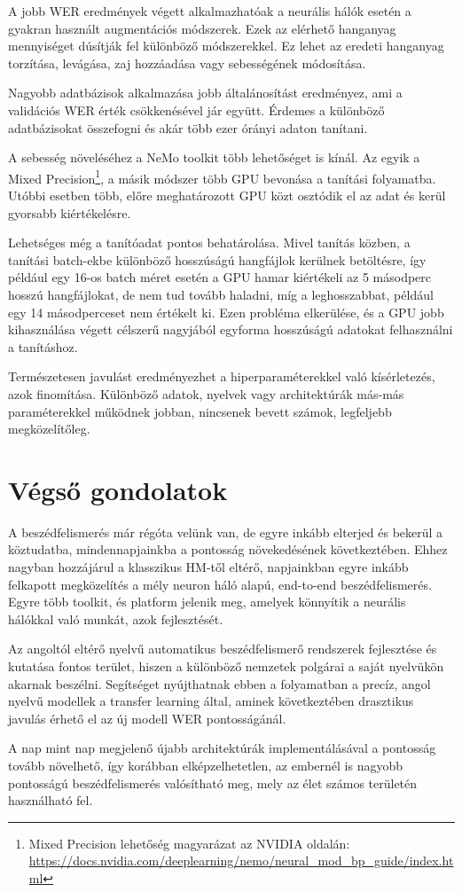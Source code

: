 A jobb WER eredmények végett alkalmazhatóak a neurális hálók esetén a gyakran használt augmentációs módszerek. Ezek az elérhető hanganyag mennyiséget dúsítják fel különböző módszerekkel. Ez lehet az eredeti hanganyag torzítása, levágása, zaj hozzáadása vagy sebességének módosítása.

Nagyobb adatbázisok alkalmazása jobb általánosítást eredményez, ami a validációs WER érték csökkenésével jár együtt. Érdemes a különböző adatbázisokat összefogni és akár több ezer órányi adaton tanítani.

A sebesség növeléséhez a NeMo toolkit több lehetőséget is kínál. Az egyik a Mixed Precision\footnote{Mixed Precision lehetőség magyarázat az NVIDIA oldalán: \url{https://docs.nvidia.com/deeplearning/nemo/neural_mod_bp_guide/index.html}}, a másik módszer több GPU bevonása a tanítási folyamatba. Utóbbi esetben több, előre meghatározott GPU közt osztódik el az adat és kerül gyorsabb kiértékelésre.

Lehetséges még a tanítóadat pontos behatárolása. Mivel tanítás közben, a tanítási batch-ekbe különböző hosszúságú hangfájlok kerülnek betöltésre, így például egy 16-os batch méret esetén a GPU hamar kiértékeli az 5 másodperc hosszú hangfájlokat, de nem tud tovább haladni, míg a leghosszabbat, például egy 14 másodperceset nem értékelt ki. Ezen probléma elkerülése, és a GPU jobb kihasználása végett célszerű nagyjából egyforma hosszúságú adatokat felhasználni a tanításhoz.

Természetesen javulást eredményezhet a hiperparaméterekkel való kísérletezés, azok finomítása. Különböző adatok, nyelvek vagy architektúrák más-más paraméterekkel működnek jobban, nincsenek bevett számok, legfeljebb megközelítőleg.

\section{Végső gondolatok}

A beszédfelismerés már régóta velünk van, de egyre inkább elterjed és bekerül a köztudatba, mindennapjainkba a pontosság növekedésének következtében. Ehhez nagyban hozzájárul a klasszikus HM-től eltérő, napjainkban egyre inkább felkapott megközelítés a mély neuron háló alapú, end-to-end beszédfelismerés. Egyre több toolkit, és platform jelenik meg, amelyek könnyítik a neurális hálókkal való munkát, azok fejlesztését.

Az angoltól eltérő nyelvű automatikus beszédfelismerő rendszerek fejlesztése és kutatása fontos terület, hiszen a különböző nemzetek polgárai a saját nyelvükön akarnak beszélni. Segítséget nyújthatnak ebben a folyamatban a precíz, angol nyelvű modellek a transfer learning által, aminek következtében drasztikus javulás érhető el az új modell WER pontosságánál.

A nap mint nap megjelenő újabb architektúrák implementálásával a pontosság tovább növelhető, így korábban elképzelhetetlen, az embernél is nagyobb pontosságú beszédfelismerés valósítható meg, mely az élet számos területén használható fel.